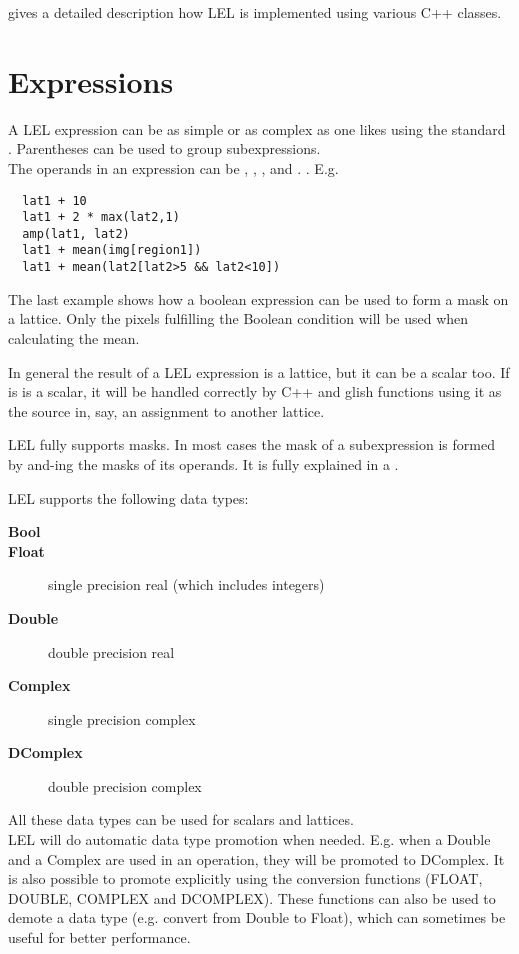 \medskip\noindent {} gives a
detailed description how LEL is implemented using various C++ classes. 


\section{\label{LEL:EXPRESSIONS}Expressions}

A LEL expression can be as simple or as complex as one likes
using the standard
.
Parentheses can be used to group subexpressions.
\\The operands in an expression can be
,
,
, and
.
.
E.g.
\begin{verbatim}
  lat1 + 10
  lat1 + 2 * max(lat2,1)
  amp(lat1, lat2)
  lat1 + mean(img[region1])
  lat1 + mean(lat2[lat2>5 && lat2<10])
\end{verbatim}

The last example shows how a boolean expression can be used to form a
mask on a lattice.  Only the pixels fulfilling the Boolean condition
will be used when calculating the mean. 

\medskip\noindent In general the result of a LEL expression is a lattice, but it
can be a scalar too. If is is a scalar, it will be handled correctly
by C++ and glish functions using it as the source in, say, an
assignment to another lattice.

\medskip\noindent LEL fully supports masks. In most cases the mask of a
subexpression is formed by and-ing the masks of its operands.
It is fully explained in a .


\label{LEL:DATATYPES}
LEL supports the following data types:
\begin{description}
  \item[ \textbf{Bool}]
  \item[ \textbf{Float}] single precision real (which includes integers)
  \item[ \textbf{Double}] double precision real
  \item[ \textbf{Complex} ] single precision complex
  \item[ \textbf{DComplex} ] double precision complex
\end{description}
All these data types can be used for scalars and lattices.
\\LEL will do automatic data type promotion when needed. E.g. when
a Double and a Complex are used in an operation, they will be promoted
to DComplex. It is also possible to promote explicitly using the
conversion functions (FLOAT, DOUBLE, COMPLEX and DCOMPLEX).
These functions can also be used to demote a data type
(e.g. convert from Double to Float), which can sometimes
be useful for better performance.

